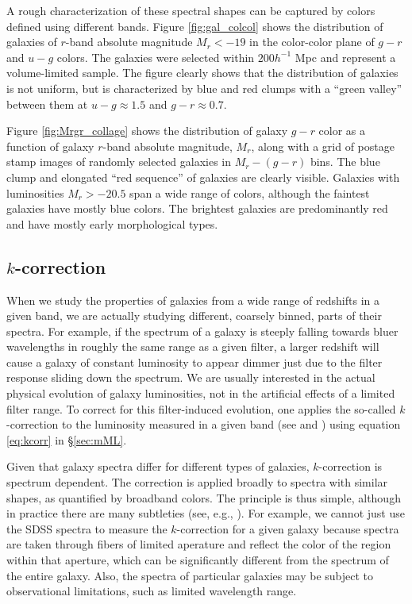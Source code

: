 A rough characterization of these spectral shapes can be captured by colors defined using different bands. Figure \ref{fig:gal_colcol} shows the distribution of galaxies of $r$-band absolute magnitude $M_r<-19$ in the color-color plane of $g-r$ and $u-g$ colors. The galaxies were selected within $200h^{-1}$ Mpc and represent a volume-limited sample. The figure clearly shows that the distribution of galaxies is not uniform, but is characterized by blue and red clumps with a ``green valley'' between them at
$u-g\approx 1.5$ and $g-r\approx 0.7$.

Figure \ref{fig:Mrgr_collage} shows the  distribution of galaxy $g-r$ color as a function of galaxy $r$-band absolute magnitude, $M_r$, along with a grid of postage stamp images of randomly selected galaxies in  $M_r-(g-r)$ bins. The blue clump and elongated ``red sequence'' of galaxies are clearly visible. Galaxies with luminosities $M_r>-20.5$ span a wide range of colors, although the faintest galaxies have mostly blue colors. The brightest galaxies are predominantly red and have mostly early morphological types.

\subsection{$k$-correction}

When we study the properties of galaxies from a wide range of redshifts in a given band, we are actually studying different, coarsely binned, parts of their spectra. For example, if the
spectrum of a galaxy is steeply falling towards bluer wavelengths in roughly the same range as a given filter, a larger redshift will cause a galaxy of constant luminosity to appear dimmer just due to the filter response sliding
down the spectrum. We are usually interested in the actual physical evolution of galaxy luminosities, not in the artificial effects of a limited filter range.
To correct for this filter-induced evolution, one applies the so-called $k$-correction to the luminosity measured in a given band (see \href{http://adsabs.harvard.edu/abs/1968ApJ...154...21O}{\citealt{oke_sandage68}} and \href{http://adsabs.harvard.edu/abs/2002astro.ph.10394H}{\citealt{hogg_etal02}}) using equation \ref{eq:kcorr} in \S \ref{sec:mML}.

Given that galaxy spectra differ for different types of galaxies, $k$-correction is spectrum dependent. The correction is applied broadly to spectra with similar shapes, as quantified by broadband colors. The principle is thus simple, although in practice there are many
subtleties (see, e.g., \href{http://adsabs.harvard.edu/abs/2007AJ....133..734B}{\citealt{blanton_roweis07}}). For example, we cannot just use the SDSS spectra to measure the $k$-correction for a given galaxy 
because spectra are taken through fibers of limited aperature and reflect the color of the region within that aperture, which can be significantly different from the 
spectrum of the entire galaxy. Also, the spectra of particular galaxies may be subject to observational limitations, such as limited wavelength range. 

